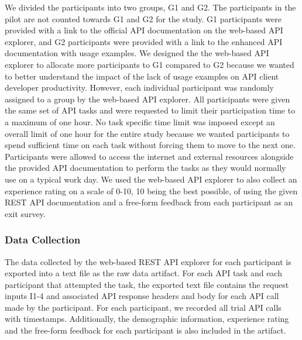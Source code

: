 \documentclass[conference]{IEEEtran}
\begin{document}
We divided the participants into two groups, G1 and G2. The participants in the pilot are not counted towards G1 and G2 for the study. G1 participants were provided with a link to the official API documentation on the web-based API explorer, and G2 participants were provided with a link to the enhanced API documentation with usage examples. We designed the the web-based API explorer to allocate more participants to G1 compared to G2 because we wanted to better understand the impact of the lack of usage examples on API client developer productivity. However, each individual participant was randomly assigned to a group by the web-based API explorer. All participants were given the same set of API tasks and were requested to limit their participation time to a maximum of one hour. No task specific time limit was imposed except an overall limit of one hour for the entire study because we wanted participants to spend sufficient time on each task without forcing them to move to the next one. Participants were allowed to access the internet and external resources alongside the provided API documentation to perform the tasks as they would normally use on a typical work day. We used the web-based API explorer to also collect an experience rating on a scale of 0-10, 10 being the best possible, of using the given REST API documentation and a free-form feedback from each participant as an exit survey.

\subsubsection{Data Collection} %
The data collected by the web-based REST API explorer for each participant is exported into a text file as the raw data artifact. For each API task and each participant that attempted the task, the exported text file contains the request inputs I1-4 and associated API response headers and body for each API call made by the participant. For each participant, we recorded all trial API calls with timestamps. Additionally, the demographic information, experience rating and the free-form feedback for each participant is also included in the artifact.


\pgfplotsset{compat=1.14}
\usetikzlibrary{patterns}
\groupone
\end{document}
